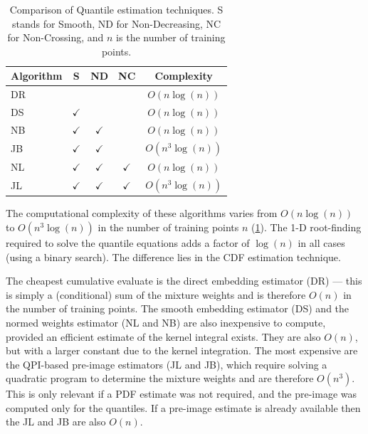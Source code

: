 \documentclass[twoside]{article} \usepackage{aistats2017}
\theoremstyle{definition}
\theoremstyle{theorem}
\newcommand{\qpi}{QPI}
\begin{document}
	\begin{table}[t!]
		\begin{center}
			\begin{tabular}{l|cccc}
				Algorithm & S & ND &   NC & Complexity \\ \hline
				DR  &              &                &                & $O(n \log(n))$    \\
				DS  & $\checkmark$ &                &                &
				$O(n \log(n))$  \\
				NB  & $\checkmark$ & $\checkmark$   &                &
				$O(n \log(n))$ \\
				JB  & $\checkmark$ & $\checkmark$   &                &
				$O(n^{3} \log(n))$ \\
				NL  & $\checkmark$ & $\checkmark$   & $\checkmark$   &
				$O(n \log(n))$ \\
				JL  & $\checkmark$ & $\checkmark$   & $\checkmark$   &   $O(n^{3} \log(n))$ 
			\end{tabular}
		\end{center}
		\caption{\small Comparison of Quantile estimation techniques. S stands for Smooth, ND for Non-Decreasing, NC for Non-Crossing, and $n$ is the number of training points.}
		\label{table:quantile_regression_methods}
	\end{table}
	
		
	The computational complexity of these algorithms varies from $O(n \log(n))$ to $O(n^{3} \log(n))$ in the number of training points $n$ (\cref{table:quantile_regression_methods}). The 1-D root-finding required to solve the quantile equations adds a factor of $\log(n)$ in all cases (using a binary search). The difference lies in the CDF estimation technique.
	
	The cheapest cumulative evaluate is the direct embedding estimator (DR) --- this is simply a (conditional) sum of the mixture weights and is therefore $O(n)$ in the number of training points. The smooth embedding estimator (DS) and the normed weights estimator (NL and NB) are also inexpensive to compute, provided an efficient estimate of the kernel integral exists. They are also $O(n)$, but with a larger constant due to the kernel integration. The most expensive are the \qpi\space-based pre-image estimators (JL and JB), which require solving a quadratic program to determine the mixture weights and are therefore $O(n^3)$. This is only relevant if a PDF estimate was not required, and the pre-image was computed only for the quantiles. If a pre-image estimate is already available then the JL and JB are also $O(n)$.
	
\end{document}
